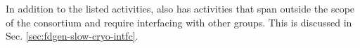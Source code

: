 In addition to the listed activities,  also has activities that span
outside the scope of the consortium and require interfacing with other
groups. This is discussed in Sec. \ref{sec:fdgen-slow-cryo-intfc}.

